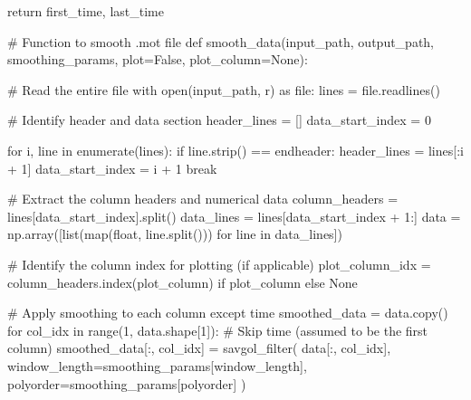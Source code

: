 \documentclass[
  letterpaper,
  DIV=11,
  numbers=noendperiod]{scrreprt}
\newenvironment{Shaded}{\begin{snugshade}}{\end{snugshade}}
\newcommand{\BuiltInTok}[1]{\textcolor[rgb]{0.00,0.23,0.31}{#1}}
\newcommand{\CommentTok}[1]{\textcolor[rgb]{0.37,0.37,0.37}{#1}}
\newcommand{\ControlFlowTok}[1]{\textcolor[rgb]{0.00,0.23,0.31}{#1}}
\newcommand{\DecValTok}[1]{\textcolor[rgb]{0.68,0.00,0.00}{#1}}
\newcommand{\ImportTok}[1]{\textcolor[rgb]{0.00,0.46,0.62}{#1}}
\newcommand{\KeywordTok}[1]{\textcolor[rgb]{0.00,0.23,0.31}{#1}}
\newcommand{\NormalTok}[1]{\textcolor[rgb]{0.00,0.23,0.31}{#1}}
\newcommand{\OperatorTok}[1]{\textcolor[rgb]{0.37,0.37,0.37}{#1}}
\newcommand{\StringTok}[1]{\textcolor[rgb]{0.13,0.47,0.30}{#1}}
\newcommand{\VariableTok}[1]{\textcolor[rgb]{0.07,0.07,0.07}{#1}}
\begin{document}
\begin{Shaded}
\begin{Highlighting}[]
    \ControlFlowTok{return}\NormalTok{ first\_time, last\_time}

\CommentTok{\# Function to smooth .mot file}
\KeywordTok{def}\NormalTok{ smooth\_data(input\_path, output\_path, smoothing\_params, plot}\OperatorTok{=}\VariableTok{False}\NormalTok{, plot\_column}\OperatorTok{=}\VariableTok{None}\NormalTok{):}

    \CommentTok{\# Read the entire file}
    \ControlFlowTok{with} \BuiltInTok{open}\NormalTok{(input\_path, }\StringTok{\textquotesingle{}r\textquotesingle{}}\NormalTok{) }\ImportTok{as} \BuiltInTok{file}\NormalTok{:}
\NormalTok{        lines }\OperatorTok{=} \BuiltInTok{file}\NormalTok{.readlines()}

    \CommentTok{\# Identify header and data section}
\NormalTok{    header\_lines }\OperatorTok{=}\NormalTok{ []}
\NormalTok{    data\_start\_index }\OperatorTok{=} \DecValTok{0}

    \ControlFlowTok{for}\NormalTok{ i, line }\KeywordTok{in} \BuiltInTok{enumerate}\NormalTok{(lines):}
        \ControlFlowTok{if}\NormalTok{ line.strip() }\OperatorTok{==} \StringTok{\textquotesingle{}endheader\textquotesingle{}}\NormalTok{:}
\NormalTok{            header\_lines }\OperatorTok{=}\NormalTok{ lines[:i }\OperatorTok{+} \DecValTok{1}\NormalTok{]}
\NormalTok{            data\_start\_index }\OperatorTok{=}\NormalTok{ i }\OperatorTok{+} \DecValTok{1}
            \ControlFlowTok{break}

    \CommentTok{\# Extract the column headers and numerical data}
\NormalTok{    column\_headers }\OperatorTok{=}\NormalTok{ lines[data\_start\_index].split()}
\NormalTok{    data\_lines }\OperatorTok{=}\NormalTok{ lines[data\_start\_index }\OperatorTok{+} \DecValTok{1}\NormalTok{:]}
\NormalTok{    data }\OperatorTok{=}\NormalTok{ np.array([}\BuiltInTok{list}\NormalTok{(}\BuiltInTok{map}\NormalTok{(}\BuiltInTok{float}\NormalTok{, line.split())) }\ControlFlowTok{for}\NormalTok{ line }\KeywordTok{in}\NormalTok{ data\_lines])}

    \CommentTok{\# Identify the column index for plotting (if applicable)}
\NormalTok{    plot\_column\_idx }\OperatorTok{=}\NormalTok{ column\_headers.index(plot\_column) }\ControlFlowTok{if}\NormalTok{ plot\_column }\ControlFlowTok{else} \VariableTok{None}

    \CommentTok{\# Apply smoothing to each column except \textquotesingle{}time\textquotesingle{}}
\NormalTok{    smoothed\_data }\OperatorTok{=}\NormalTok{ data.copy()}
    \ControlFlowTok{for}\NormalTok{ col\_idx }\KeywordTok{in} \BuiltInTok{range}\NormalTok{(}\DecValTok{1}\NormalTok{, data.shape[}\DecValTok{1}\NormalTok{]):  }\CommentTok{\# Skip \textquotesingle{}time\textquotesingle{} (assumed to be the first column)}
\NormalTok{        smoothed\_data[:, col\_idx] }\OperatorTok{=}\NormalTok{ savgol\_filter(}
\NormalTok{            data[:, col\_idx], }
\NormalTok{            window\_length}\OperatorTok{=}\NormalTok{smoothing\_params[}\StringTok{\textquotesingle{}window\_length\textquotesingle{}}\NormalTok{], }
\NormalTok{            polyorder}\OperatorTok{=}\NormalTok{smoothing\_params[}\StringTok{\textquotesingle{}polyorder\textquotesingle{}}\NormalTok{]}
\NormalTok{        )}


\end{Highlighting}
\end{Shaded}
\end{document}
